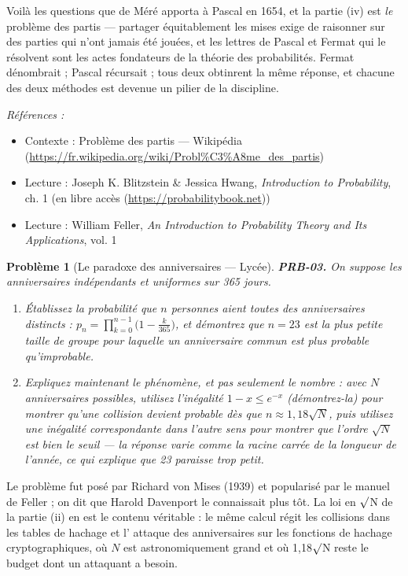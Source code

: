 \documentclass[11pt]{article}
\newtheorem{problem}{Problème}
\newenvironment{refs}{\par\small\noindent\emph{Références :}\begin{itemize}\setlength\itemsep{0pt}}{\end{itemize}\normalsize}
\begin{document}
\noindent Voilà les questions que de Méré apporta à Pascal en 1654, et la partie (iv) est
\textit{le} problème des partis --- partager équitablement les mises exige de raisonner sur des
parties qui n'ont jamais été jouées, et les lettres de Pascal et Fermat qui le résolvent sont les
actes fondateurs de la théorie des probabilités. Fermat dénombrait ; Pascal récursait ; tous deux
obtinrent la même réponse, et chacune des deux méthodes est devenue un pilier de la
discipline.

\begin{refs}
\item Contexte : Problème des partis --- Wikipédia (\url{https://fr.wikipedia.org/wiki/Probl%C3%A8me_des_partis})
\item Lecture : Joseph K. Blitzstein \& Jessica Hwang, \textit{Introduction to Probability}, ch. 1 (en libre accès (\url{https://probabilitybook.net}))
\item Lecture : William Feller, \textit{An Introduction to Probability Theory and Its Applications}, vol. 1
\end{refs}

\bigskip

\begin{problem}[{Le paradoxe des anniversaires --- Lycée}]
\textbf{PRB-03.} On suppose les anniversaires indépendants et uniformes sur
365 jours.
\begin{enumerate}
\item[(i)] Établissez la probabilité que $ n $ personnes aient toutes des anniversaires distincts :
$ p_n = \prod_{k=0}^{n-1} \big(1 - \frac{k}{365}\big) $, et démontrez que $ n = 23 $ est la
plus petite taille de groupe pour laquelle un anniversaire commun est plus probable
qu'improbable.
\item[(ii)] Expliquez maintenant le phénomène, et pas seulement le nombre : avec $ N $ anniversaires
possibles, utilisez l'inégalité $ 1 - x \le e^{-x} $ (démontrez-la) pour montrer qu'une
collision devient probable dès que $ n \approx 1{,}18\sqrt{N} $, puis utilisez une inégalité
correspondante dans l'autre sens pour montrer que l'ordre $ \sqrt{N} $ est bien le seuil --- la
réponse varie comme la racine carrée de la longueur de l'année, ce qui explique que 23 paraisse
trop petit.
\end{enumerate}

\end{problem}

\noindent Le problème fut posé par Richard von Mises (1939) et popularisé par le manuel
de Feller ; on dit que Harold Davenport le connaissait plus tôt. La loi en $\surd$N de la partie (ii)
en est le contenu véritable : le même calcul régit les collisions dans les tables de hachage et
l'\og{} attaque des anniversaires \fg{} sur les fonctions de hachage cryptographiques, où $ N $ est
astronomiquement grand et où 1,18$\surd$N reste le budget dont un attaquant a besoin.
\end{document}
